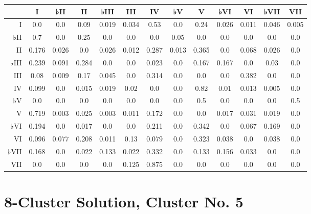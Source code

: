 \begin{table}[htbp]
\begin{minipage}{\linewidth}
\setlength{\tymax}{0.5\linewidth}
\centering
\small
\begin{tabulary}{\textwidth}{@{}RCCCCCCCCCCCC@{}} \toprule
&I&♭II&II&♭III&III&IV&♭V&V&♭VI&VI&♭VII&VII\\
\midrule
I&0.0&0.0&0.09&0.019&0.034&0.53&0.0&0.24&0.026&0.011&0.046&0.005\\
♭II&0.7&0.0&0.25&0.0&0.0&0.0&0.05&0.0&0.0&0.0&0.0&0.0\\
II&0.176&0.026&0.0&0.026&0.012&0.287&0.013&0.365&0.0&0.068&0.026&0.0\\
♭III&0.239&0.091&0.284&0.0&0.0&0.023&0.0&0.167&0.167&0.0&0.03&0.0\\
III&0.08&0.009&0.17&0.045&0.0&0.314&0.0&0.0&0.0&0.382&0.0&0.0\\
IV&0.099&0.0&0.015&0.019&0.02&0.0&0.0&0.82&0.01&0.013&0.005&0.0\\
♭V&0.0&0.0&0.0&0.0&0.0&0.0&0.0&0.5&0.0&0.0&0.0&0.5\\
V&0.719&0.003&0.025&0.003&0.011&0.172&0.0&0.0&0.017&0.031&0.019&0.0\\
♭VI&0.194&0.0&0.017&0.0&0.0&0.211&0.0&0.342&0.0&0.067&0.169&0.0\\
VI&0.096&0.077&0.208&0.011&0.13&0.079&0.0&0.323&0.038&0.0&0.038&0.0\\
♭VII&0.168&0.0&0.022&0.133&0.022&0.332&0.0&0.133&0.156&0.033&0.0&0.0\\
VII&0.0&0.0&0.0&0.0&0.125&0.875&0.0&0.0&0.0&0.0&0.0&0.0\\

\bottomrule

\end{tabulary}
\end{minipage}
\end{table}

\section{8-Cluster Solution, Cluster No. 5}
\label{8-clustersolutionclusterno.5}

